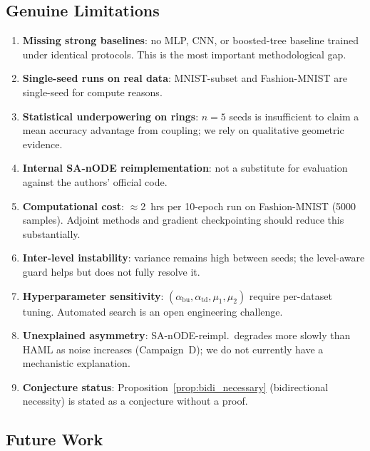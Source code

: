 \documentclass[11pt,a4paper]{article}
\begin{document}
\subsection{Genuine Limitations}

\begin{enumerate}
  \item \textbf{Missing strong baselines}: no MLP, CNN, or boosted-tree baseline trained
        under identical protocols. This is the most important methodological gap.
  \item \textbf{Single-seed runs on real data}: MNIST-subset and Fashion-MNIST are
        single-seed for compute reasons.
  \item \textbf{Statistical underpowering on rings}: $n=5$ seeds is insufficient to claim
        a mean accuracy advantage from coupling; we rely on qualitative geometric
        evidence.
  \item \textbf{Internal SA-nODE reimplementation}: not a substitute for evaluation
        against the authors' official code.
  \item \textbf{Computational cost}: $\approx$2~hrs per 10-epoch run on Fashion-MNIST
        (5000 samples). Adjoint methods and gradient checkpointing should reduce this
        substantially.
  \item \textbf{Inter-level instability}: variance remains high between seeds; the
        level-aware guard helps but does not fully resolve it.
  \item \textbf{Hyperparameter sensitivity}: $(\alpha_{\mathrm{bu}}, \alpha_{\mathrm{td}}, \mu_1, \mu_2)$
        require per-dataset tuning. Automated search is an open engineering challenge.
  \item \textbf{Unexplained asymmetry}: SA-nODE-reimpl.\ degrades more slowly than HAML
        as noise increases (Campaign~D); we do not currently have a mechanistic
        explanation.
  \item \textbf{Conjecture status}: Proposition~\ref{prop:bidi_necessary} (bidirectional
        necessity) is stated as a conjecture without a proof.
\end{enumerate}

\subsection{Future Work}
\label{sec:future}
\end{document}
